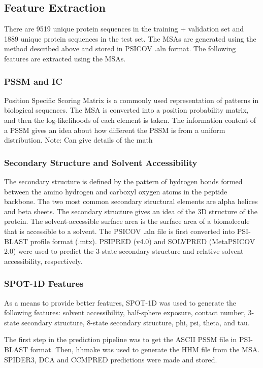 \documentclass[journal=jacsat,manuscript=article]{achemso}
\begin{document}
\subsection{Feature Extraction}
\quad There are 9519 unique protein sequences in the training + validation set and 1889 unique protein sequences in the test set. The MSAs are generated using the method described above and stored in PSICOV \cite{jones2012psicov} .aln format. The following features are extracted using the MSAs.

\subsubsection{PSSM and IC}
\quad Position Specific Scoring Matrix is a commonly used representation of patterns in biological sequences. The MSA is converted into a position probability matrix, and then the log-likelihoods of each element is taken. The information content of a PSSM gives an idea about how different the PSSM is from a uniform distribution.
Note: Can give details of the math

\subsubsection{Secondary Structure and Solvent Accessibility}
\quad The secondary structure is defined by the pattern of hydrogen bonds formed between the amino hydrogen and carboxyl oxygen atoms in the peptide backbone. The two most common secondary structural elements are alpha helices and beta sheets. The secondary structure gives an idea of the 3D structure of the protein.
The solvent-accessible surface area is the surface area of a biomolecule that is accessible to a solvent.
The PSICOV .aln file is first converted into PSI-BLAST \cite{altschul1997gapped} profile format (.mtx). PSIPRED (v4.0) and SOLVPRED (MetaPSICOV 2.0) were used to predict the 3-state secondary structure and relative solvent accessibility, respectively.

\subsubsection{SPOT-1D Features}
\quad As a means to provide better features, SPOT-1D \cite{hanson2019improving} was used to generate the following features: solvent accessibility, half-sphere exposure, contact number, 3-state secondary structure, 8-state secondary structure, phi, psi, theta, and tau.

The first step in the prediction pipeline was to get the ASCII PSSM file in PSI-BLAST format. Then, hhmake was used to generate the HHM file from the MSA. SPIDER3, DCA and CCMPRED predictions were made and stored.
\end{document}

